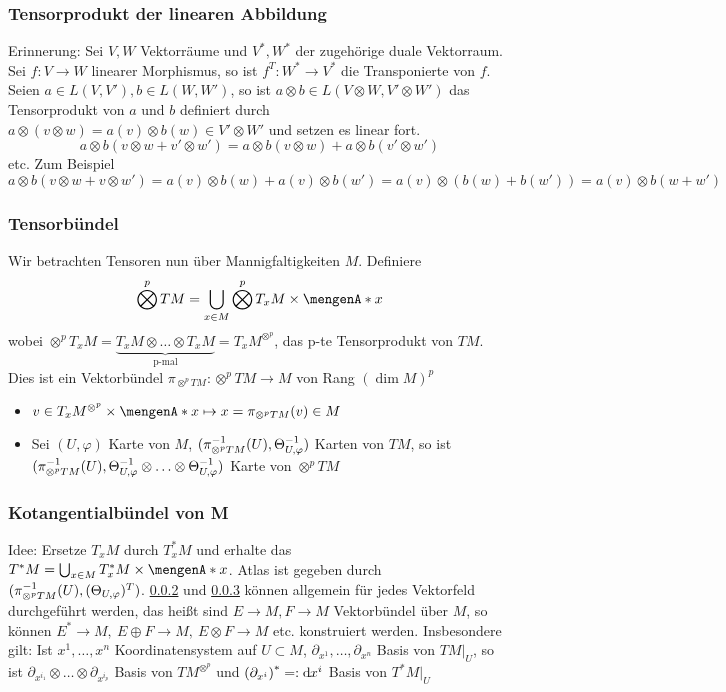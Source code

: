 \subsubsection{Tensorprodukt der linearen Abbildung}
\label{ssub:172}
Erinnerung: Sei $V, W$ Vektorräume und $V^*,W^*$ der zugehörige duale Vektorraum. Sei $f:V\to W$ linearer Morphismus, so ist $f^T: W^*\to V^*$ die Transponierte von $f$. Seien $a\in L(V,V'), b\in L(W,W')$, so ist $a\otimes b \in L(V\otimes W,V'\otimes W')$ das Tensorprodukt von $a$ und $b$ definiert durch $a\otimes(v\otimes w) = a(v)\otimes b(w)\in V'\otimes W'$ und setzen es linear fort.
\[
a\otimes b (v\otimes w +v'\otimes w') = a\otimes b(v\otimes w) + a\otimes b(v'\otimes w')
\]
etc. Zum Beispiel
\[
a\otimes b (v\otimes w +v\otimes w') = a(v)\otimes b(w) + a(v)\otimes b(w') = a(v)\otimes (b(w)+b(w')) = a(v)\otimes b(w+w')
\]

\subsubsection{Tensorbündel}
\label{ssub:173}
Wir betrachten Tensoren nun über Mannigfaltigkeiten $M$. Definiere
\[
\bigotimes^p TM = \bigcup_{x\in M} \bigotimes^p T_x M\times \set{x}
\]
wobei $\otimes^p T_x M = \underbrace{T_x M \otimes \ldots \otimes T_x M}_{\text{p-mal}} = T_x M^{\otimes^p}$, das p-te Tensorprodukt von $TM$. Dies ist ein Vektorbündel $\pi_{\otimes^p TM}: \otimes^p TM\to M$ von Rang $(\dim M)^p$
\begin{itemize}
\item $v\in T_x M^{\otimes^p}\times \set{x} \mapsto x = \pi_{\otimes^p TM}(v) \in M$
\item Sei $(U,\varphi)$ Karte von $M$, $\enbrace{\pi_{\otimes^p TM}^{-1}(U), \Theta_{U,\varphi}^{-1}}$ Karten von $TM$, so ist $\enbrace{\pi_{\otimes^p TM}^{-1}(U), \Theta^{-1}_{U,\varphi}\otimes \ldots \otimes \Theta^{-1}_{U,\varphi}}$ Karte von $\otimes^p TM$
\end{itemize} 

\subsubsection{Kotangentialbündel von M}
\label{ssub:174}
Idee: Ersetze $T_x M$ durch $T_x^* M$ und erhalte das  $T^* M = \bigcup_{x\in M} T_x^* M \times \set{x}$. Atlas ist gegeben durch $\enbrace{\pi_{\otimes^p TM}^{-1}(U), \enbrace{\Theta_{U,\varphi}}^{T}}$. \ref{ssub:173} und \ref{ssub:174} können allgemein für jedes Vektorfeld durchgeführt werden, das heißt sind $E\to M, F\to M$ Vektorbündel über $M$, so können $E^*\to M,\ E\oplus F\to M,\ E\otimes F\to M$ etc. konstruiert werden.
Insbesondere gilt: Ist $x^1,\ldots,x^n$ Koordinatensystem auf $U\subset M$, $\partial_{x^1},\ldots, \partial_{x^n}$ Basis von $TM\vert_U$, so ist $\partial_{x^{i_1}}\otimes \ldots \otimes \partial_{x^{i_p}}$ Basis von $TM^{\otimes^p}$ und $\enbrace*{\partial_{x^i}}^* =: \mathd x^i$ Basis von $T^* M\vert_U$

